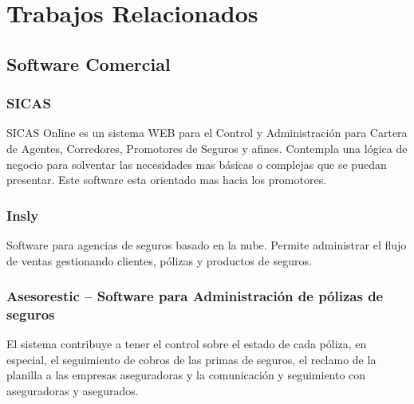 \section*{Trabajos Relacionados}
\subsection*{Software Comercial}
\subsubsection*{SICAS \cite{www:sicas}} 

SICAS Online es un sistema WEB para el Control y Administración para Cartera de Agentes, Corredores, Promotores de Seguros y afines. Contempla una lógica de negocio para solventar las necesidades mas básicas o complejas que se puedan presentar. Este software esta orientado mas hacia los promotores.

\subsubsection*{Insly \cite{www:insly}}

Software para agencias de seguros basado en la nube. Permite administrar el flujo de ventas gestionando clientes, pólizas y productos de seguros.

\subsubsection*{Asesorestic – Software para Administración de pólizas de seguros \cite{www:asesorestic}}

El sistema contribuye a tener el control sobre el estado de cada póliza, en especial, el seguimiento de cobros de las primas de seguros, el reclamo de la planilla a las empresas aseguradoras y la comunicación y seguimiento con aseguradoras y asegurados.


